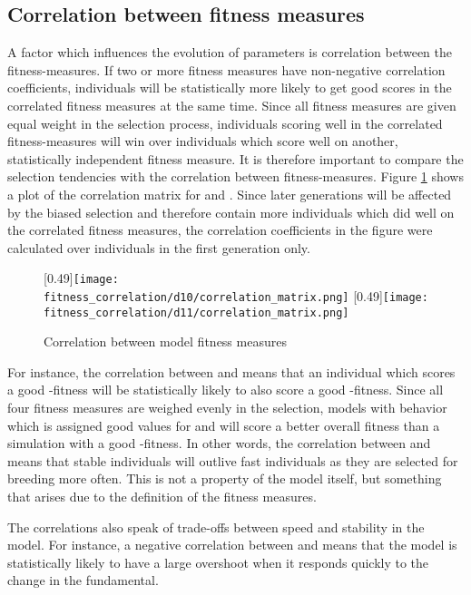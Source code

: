 \subsection{Correlation between fitness measures}\label{section:correlation_fitness}
A factor which influences the evolution of parameters is correlation between the fitness-measures. If two or more fitness measures have non-negative correlation coefficients, individuals will be statistically more likely to get good scores in the correlated fitness measures at the same time. Since all fitness measures are given equal weight in the selection process, individuals scoring well in the correlated fitness-measures will win over individuals which score well on another, statistically independent fitness measure. It is therefore important to compare the selection tendencies with the correlation between fitness-measures. Figure \ref{figure:fitness_correlation} shows a plot of the correlation matrix for \dten{} and \deleven. Since later generations will be affected by the biased selection and therefore contain more individuals which did well on the correlated fitness measures, the correlation coefficients in the figure were calculated over individuals in the first generation only.
\begin{figure}
	\centering
	\subcaptionbox{\dten}
	[0.49\linewidth]{\texttt{[image: fitness\_correlation/d10/correlation\_matrix.png]}}
	\subcaptionbox{\deleven}
		[0.49\linewidth]{\texttt{[image: fitness\_correlation/d11/correlation\_matrix.png]}}
	\caption{Correlation between model fitness measures}
	\label{figure:fitness_correlation}
\end{figure}

For instance, the correlation between \overshoot{} and \stdev{} means that an individual which scores a good \overshoot-fitness will be statistically likely to also score a good \stdev-fitness. Since all four fitness measures are weighed evenly in the selection, models with behavior which is assigned good values for \overshoot{} and \stdev{} will score a better overall fitness than a simulation with a good \timetoreachnewfundamental-fitness. In other words, the correlation between \stdev{} and \overshoot{} means that stable individuals will outlive fast individuals as they are selected for breeding more often. This is not a property of the model itself, but something that arises due to the definition of the fitness measures. 

The correlations also speak of trade-offs between speed and stability in the model. For instance, a negative correlation between \overshoot{} and \timetoreachnewfundamental{} means that the model is statistically likely to have a large overshoot when it responds quickly to the change in the fundamental.

